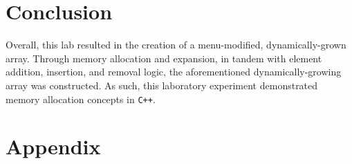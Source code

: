 \documentclass[
	letterpaper, %
	10pt, %
]{CSUniSchoolLabReport}
\begin{document}
\section{Conclusion}

\hspace{.5 in} Overall, this lab resulted in the creation of a menu-modified, dynamically-grown array. Through memory allocation and expansion, in tandem with element addition, insertion, and removal logic, the aforementioned dynamically-growing array was constructed. As such, this laboratory experiment demonstrated memory allocation concepts in \texttt{C++}.

\section{Appendix}


\end{document}
